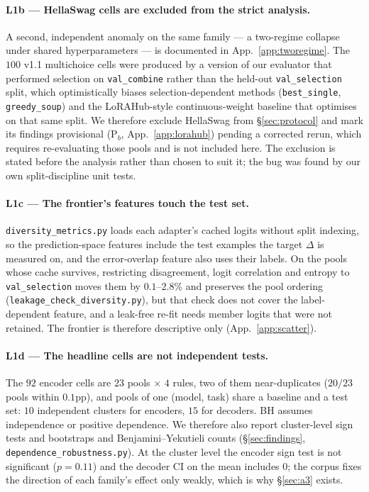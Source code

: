 \documentclass[11pt]{article}
\begin{document}
\paragraph{L1b — HellaSwag cells are excluded from the strict analysis.} A second, independent anomaly on the same family --- a two-regime collapse under shared hyperparameters --- is documented in App.~\ref{app:tworegime}. The $100$ v1.1 multichoice cells were produced by a version of our evaluator that performed selection on \texttt{val\_combine} rather than the held-out \texttt{val\_selection} split, which optimistically biases selection-dependent methods (\texttt{best\_single}, \texttt{greedy\_soup}) and the LoRAHub-style continuous-weight baseline that optimises on that same split. We therefore exclude HellaSwag from \S\ref{sec:protocol} and mark its findings provisional (P$_b$, App.~\ref{app:lorahub}) pending a corrected rerun, which requires re-evaluating those pools and is not included here. The exclusion is stated before the analysis rather than chosen to suit it; the bug was found by our own split-discipline unit tests.

\paragraph{L1c — The frontier's features touch the test set.} \texttt{diversity\_\allowbreak metrics.\allowbreak py} loads each adapter's cached logits without split indexing, so the prediction-space features include the test examples the target $\Delta$ is measured on, and the error-overlap feature also uses their labels. On the pools whose cache survives, restricting disagreement, logit correlation and entropy to \texttt{val\_selection} moves them by $0.1$--$2.8\%$ and preserves the pool ordering (\texttt{leakage\_\allowbreak check\_\allowbreak diversity.\allowbreak py}), but that check does not cover the label-dependent feature, and a leak-free re-fit needs member logits that were not retained. The frontier is therefore descriptive only (App.~\ref{app:scatter}).

\paragraph{L1d — The headline cells are not independent tests.} The $92$ encoder cells are $23$ pools $\times$ $4$ rules, two of them near-duplicates ($20/23$ pools within $0.1$pp), and pools of one (model, task) share a baseline and a test set: $10$ independent clusters for encoders, $15$ for decoders. BH assumes independence or positive dependence. We therefore also report cluster-level sign tests and bootstraps and Benjamini--Yekutieli counts (\S\ref{sec:findings}, \texttt{dependence\_\allowbreak robustness.\allowbreak py}). At the cluster level the encoder sign test is not significant ($p{=}0.11$) and the decoder CI on the mean includes $0$; the corpus fixes the direction of each family's effect only weakly, which is why \S\ref{sec:a3} exists.
\end{document}
